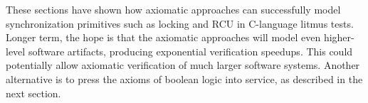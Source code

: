 \QuickQuizEnd

These sections have shown how axiomatic approaches can successfully
model synchronization primitives such as locking and RCU in C-language
litmus tests.
Longer term, the hope is that the axiomatic approaches will model
even higher-level software artifacts, producing exponential
verification speedups.
This could potentially allow axiomatic verification of much larger
software systems.
Another alternative is to press the axioms of boolean logic into service,
as described in the next section.
